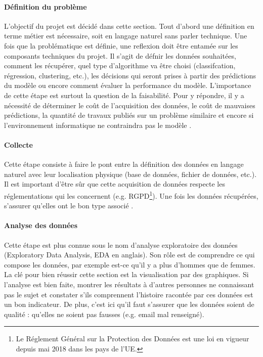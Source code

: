 \documentclass[10pt, french, a4paper]{report}
\begin{document}
\paragraph{Définition du problème}
L'objectif du projet est décidé dans cette section. Tout d'abord une définition en terme métier est nécessaire, soit en langage naturel sans parler technique. Une fois que la problématique est définie, une reflexion doit être entamée sur les composants techniques du projet. Il s'agit de défnir les données souhaitées, comment les récupérer, quel type d'algorithme va être choisi (classifcation, régression, clustering, etc.), les décisions qui seront prises à partir des prédictions du modèle ou encore comment évaluer la performance du modèle. L'importance de cette étape est surtout la question de la faisabilité. Pour y répondre, il y a nécessité de déterminer le coût de l'acquisition des données, le coût de mauvaises prédictions, la quantité de travaux publiés sur un problème similaire et encore si l'environnement informatique ne contraindra pas le modèle \citep{jordan_organizing_2018}.

\paragraph{Collecte}
Cette étape consiste à faire le pont entre la définition des données en langage naturel avec leur localisation physique (base de données, fichier de données, etc.). Il est important d'être sûr que cette acquisition de données respecte les réglementations qui les concernent (e.g. RGPD\footnote{Le Réglement Général sur la Protection des Données est une loi en vigueur depuis mai 2018 dans les pays de l'UE.}). Une fois les données récupérées, s'assurer qu'elles ont le bon type associé \citep{mayo_machine_2018}.

\paragraph{Analyse des données}
Cette étape est plus connue sous le nom d'analyse exploratoire des données (Exploratory Data Analysis, EDA en anglais). Son rôle est de comprendre ce qui compose les données, par exemple est-ce qu'il y a plus d'hommes que de femmes. La clé pour bien réussir cette section est la visualisation par des graphiques. Si l'analyse est bien faite, montrer les résultats à d'autres personnes ne connaissant pas le sujet et constater s'ils comprennent l'histoire racontée par ces données est un bon indicateur. De plus, c'est ici qu'il faut s'assurer que les données soient de qualité : qu'elles ne soient pas fausses (e.g. email mal renseigné).
\end{document}

